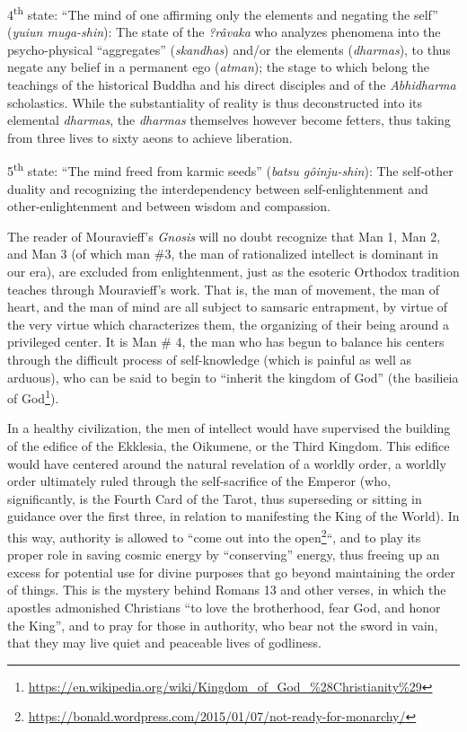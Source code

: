 \begin{quotationx}
4\textsuperscript{th} state: ``The mind of one affirming only the elements and negating the self'' (\emph{yuiun muga-shin}): The state of the \emph{?râvaka} who analyzes phenomena into the psycho-physical ``aggregates'' (\emph{skandhas}) and/or the elements (\emph{dharmas}), to thus negate any belief in a permanent ego (\emph{atman}); the stage to which belong the teachings of the historical Buddha and his direct disciples and of the \emph{Abhidharma} scholastics. While the substantiality of reality is thus deconstructed into its elemental \emph{dharmas}, the \emph{dharmas} themselves however become fetters, thus taking from three lives to sixty aeons to achieve liberation.

5\textsuperscript{th} state: ``The mind freed from karmic seeds'' (\emph{batsu gôinju-shin}): The self-other duality and recognizing the interdependency between self-enlightenment and other-enlightenment and between wisdom and compassion.
\end{quotationx}


The reader of Mouravieff's \emph{Gnosis} will no doubt recognize that Man 1, Man 2, and Man 3 (of which man \#3, the man of rationalized intellect is dominant in our era), are excluded from enlightenment, just as the esoteric Orthodox tradition teaches through Mouravieff's work. That is, the man of movement, the man of heart, and the man of mind are all subject to samsaric entrapment, by virtue of the very virtue which characterizes them, the organizing of their being around a privileged center. It is Man \# 4, the man who has begun to balance his centers through the difficult process of self-knowledge (which is painful as well as arduous), who can be said to begin to ``inherit the kingdom of God'' (the basilieia of God\footnote{\url{https://en.wikipedia.org/wiki/Kingdom\_of\_God\_\%28Christianity\%29}}).

In a healthy civilization, the men of intellect would have supervised the building of the edifice of the Ekklesia, the Oikumene, or the Third Kingdom. This edifice would have centered around the natural revelation of a worldly order, a worldly order ultimately ruled through the self-sacrifice of the Emperor (who, significantly, is the Fourth Card of the Tarot, thus superseding or sitting in guidance over the first three, in relation to manifesting the King of the World). In this way, authority is allowed to ``come out into the open\footnote{\url{https://bonald.wordpress.com/2015/01/07/not-ready-for-monarchy/}}``, and to play its proper role in saving cosmic energy by ``conserving'' energy, thus freeing up an excess for potential use for divine purposes that go beyond maintaining the order of things. This is the mystery behind Romans 13 and other verses, in which the apostles admonished Christians ``to love the brotherhood, fear God, and honor the King'', and to pray for those in authority, who bear not the sword in vain, that they may live quiet and peaceable lives of godliness.


